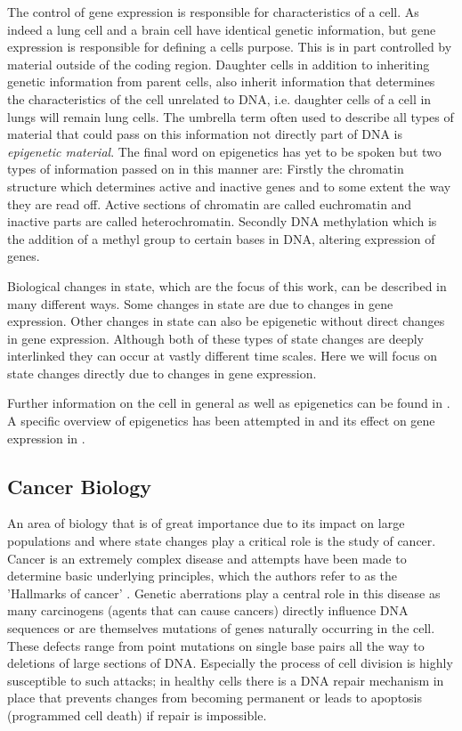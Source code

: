 The control of gene expression is responsible for characteristics of a cell. As indeed a lung cell and a brain cell have  identical genetic information, but gene expression is responsible for defining a cells purpose. This is in part controlled by material outside of the coding region. Daughter cells in addition to inheriting genetic information from parent cells, also inherit information that determines the characteristics of the cell unrelated to DNA, i.e. daughter cells of a cell in lungs will remain lung cells. The umbrella term often used to describe all types of material that could pass on this information not directly part of DNA is \emph{epigenetic material}. The final word on epigenetics has yet to be spoken but two types of information passed on in this manner are: Firstly the chromatin structure which determines active and inactive genes and to some extent the way they are read off. Active sections of chromatin are called euchromatin and inactive parts are called heterochromatin. Secondly DNA methylation which is the addition of a methyl group to certain bases in DNA, altering expression of genes. 

Biological changes in state, which are the focus of this work, can be described in many different ways. Some changes in state are due to changes in gene expression. Other changes in state can also be epigenetic without direct changes in gene expression. Although both of these types of state changes are deeply interlinked they can occur at vastly different time scales. Here we will focus on state changes directly due to changes in gene expression.  

Further information on the cell in general as well as epigenetics can be found in \cite[Chapters~1,7]{Alberts:2007tv}. A specific overview of epigenetics has been attempted in \cite{Goldberg:2007tl} and its effect on gene expression in \cite{Gibney:2010ws}. 

\subsection{Cancer Biology}
\label{sec:cancer-biology}

An area of biology that is of great importance due to its impact on large populations and where state changes play a critical role is the study of cancer. Cancer is an extremely complex disease and attempts have been made to determine basic underlying principles, which the authors refer to as the 'Hallmarks of cancer' \citep{Hannah:2000wo, Hanahan:2011gu}. Genetic aberrations play a central role in this disease as many carcinogens (agents that can cause cancers) directly influence DNA sequences or are themselves mutations of genes naturally occurring in the cell. These defects range from point mutations on single base pairs all the way to deletions of large sections of DNA. Especially the process of cell division is highly susceptible to such attacks; in healthy cells there is a DNA repair mechanism in place that prevents  changes from becoming permanent or leads to apoptosis (programmed cell death) if repair is impossible. 

